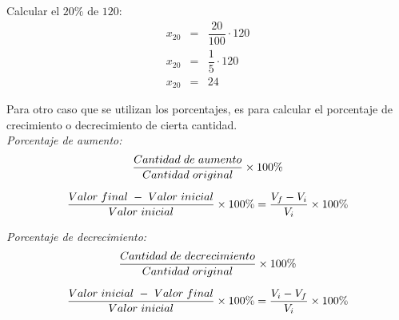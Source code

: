 \begin{myexample}
Calcular el $20\%$ de $120$:
\begin{eqnarray*}
x_{20}&=&\dfrac{20}{100}\cdot 120\\
x_{20}&=&\dfrac{1}{5}\cdot 120\\
x_{20}&=&24
\end{eqnarray*}
\end{myexample}

Para otro caso que se utilizan los porcentajes, es para calcular el porcentaje de crecimiento o decrecimiento de cierta cantidad.\\

\noindent \textit{Porcentaje de aumento:}\\
\begin{eqnarray}
\dfrac{Cantidad\hspace{3px}de\hspace{3px}aumento}{Cantidad\hspace{3px}original}\times 100\%
\end{eqnarray}

\begin{eqnarray}
\dfrac{Valor\hspace{3px}final\hspace{3px}-\hspace{3px}Valor\hspace{3px}inicial}{Valor\hspace{3px}inicial}\times 100\%= \dfrac{V_{f}-V_{i}}{V_{i}}\times 100\%
\end{eqnarray}


\noindent \textit{Porcentaje de decrecimiento:}\\
\begin{eqnarray}
\dfrac{Cantidad\hspace{3px}de\hspace{3px}decrecimiento}{Cantidad\hspace{3px}original}\times 100\%
\end{eqnarray}

\begin{eqnarray}
\dfrac{Valor\hspace{3px}inicial\hspace{3px}-\hspace{3px}Valor\hspace{3px}final}{Valor\hspace{3px}inicial}\times 100\%=\dfrac{V_{i}-V_{f}}{V_{i}}\times 100\%
\label{percent1}
\end{eqnarray}


